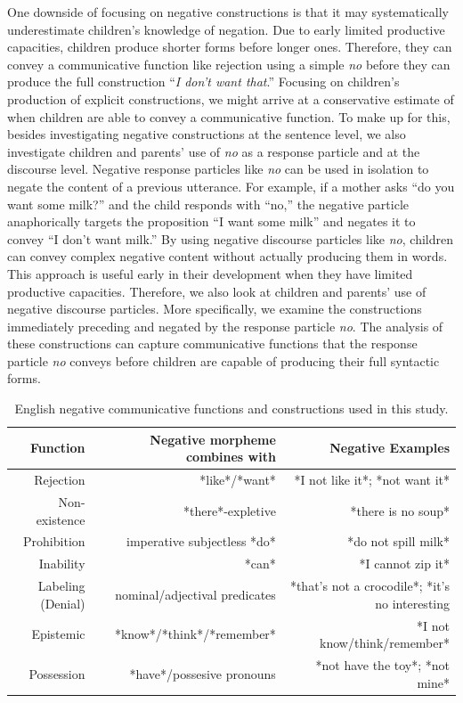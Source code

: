 \documentclass[
  english,
  man,floatsintext]{apa6}
\begin{document}
One downside of focusing on negative constructions is that it may systematically underestimate children's knowledge of negation. Due to early limited productive capacities, children produce shorter forms before longer ones. Therefore, they can convey a communicative function like rejection using a simple \emph{no} before they can produce the full construction ``\emph{I don't want that}.'' Focusing on children's production of explicit constructions, we might arrive at a conservative estimate of when children are able to convey a communicative function. To make up for this, besides investigating negative constructions at the sentence level, we also investigate children and parents' use of \emph{no} as a response particle and at the discourse level. Negative response particles like \emph{no} can be used in isolation to negate the content of a previous utterance. For example, if a mother asks ``do you want some milk?'' and the child responds with ``no,'' the negative particle anaphorically targets the proposition ``I want some milk'' and negates it to convey ``I don't want milk.'' By using negative discourse particles like \emph{no}, children can convey complex negative content without actually producing them in words. This approach is useful early in their development when they have limited productive capacities. Therefore, we also look at children and parents' use of negative discourse particles. More specifically, we examine the constructions immediately preceding and negated by the response particle \emph{no}. The analysis of these constructions can capture communicative functions that the response particle \emph{no} conveys before children are capable of producing their full syntactic forms.

\begin{table}[h]
\small
\centering
\begin{tabular}{rrr}
\hline
\textbf{Function} & \textbf{Negative morpheme combines with} & \textbf{Negative Examples} \\
\hline
Rejection & *like*/*want* & *I not like it*; *not want it* \\
Non-existence & *there*-expletive & *there is no soup*  \\
Prohibition & imperative subjectless *do* & *do not spill milk* \\
Inability & *can* & *I cannot zip it*  \\
Labeling (Denial) & nominal/adjectival predicates & *that's not a crocodile*; *it's no interesting  \\
Epistemic & *know*/*think*/*remember*  & *I not know/think/remember*  \\
Possession & *have*/possesive pronouns & *not have the toy*; *not mine*  \\
\hline
\end{tabular}
\caption{English negative communicative functions and constructions used in this study.}
\end{table}
\end{document}
